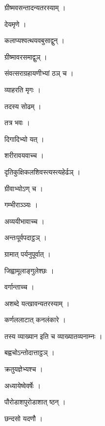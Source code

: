 \documentclass[10pt, openany]{book}
\begin{document}
\noindent ग्रीष्मवसन्तादन्यतरस्याम् ।

\noindent देयमृणे ।

\noindent कलाप्यश्वत्थयवबुसाद्वुन् ।

\noindent ग्रीष्मावरसमाद्वुञ् ।

\noindent संवत्सराग्रहायणीभ्यां ठञ् च ।

\noindent व्याहरति मृगः ।

\noindent तदस्य सोढम् ।

\noindent तत्र भवः ।

\noindent दिगादिभ्यो यत् ।

\noindent शरीरावयवाच्च ।

\noindent दृतिकुक्षिकलशिवस्त्यस्त्यहेर्ढञ् ।

\noindent ग्रीवाभ्योऽण् च ।

\noindent गम्भीराञ्ञ्यः ।

\noindent अव्ययीभावाच्च ।

\noindent अन्तःपूर्वपदाट्ठञ् ।

\noindent ग्रामात् पर्यनुपूर्वात् ।

\noindent जिह्वामूलाङ्गुलेश्छः ।

\noindent वर्गान्ताच्च ।

\noindent अशब्दे यत्खावन्यतरस्याम् ।

\noindent कर्णललाटात् कनलंकारे ।

\noindent तस्य व्याख्यान इति च व्याख्यातव्यनाम्नः ।

\noindent बह्वचोऽन्तोदात्ताट्ठञ् ।

\noindent क्रतुयज्ञेभ्यश्च ।

\noindent अध्यायेष्वेवर्षेः ।

\noindent पौरोडाशपुरोडाशात् ष्ठन् ।

\noindent छन्दसो यदणौ ।
\end{document}
